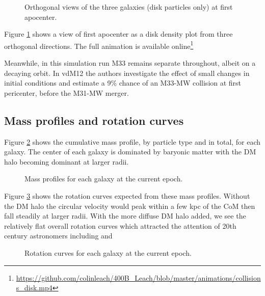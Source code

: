 \documentclass[twocolumn]{aastex63}
\newcommand{\todo}{\color{red}{TODO}\color{black}\hspace{2mm}}
\begin{document}
\begin{figure}[hbt!]
	\caption{Orthogonal views of the three galaxies (disk particles only) at first apocenter. \todo{improve this visually!}
		\label{fig:3view_first_apo}}
\end{figure}

Figure \ref{fig:3view_first_apo} shows a view of first apocenter as a disk density plot from three orthogonal directions. The full animation is available online\footnote{\url{https://github.com/colinleach/400B_Leach/blob/master/animations/collisions_disk.mp4}}


Meanwhile, in this simulation run M33 remains separate throughout, albeit on a decaying orbit. In vdM12 the authors investigate the effect of small changes in initial conditions and estimate a 9\% chance of an M33-MW collision at first pericenter, before the M31-MW merger.

\subsection{Mass profiles and rotation curves}

Figure \ref{fig:massprof0} shows the cumulative mass profile, by particle type and in total, for each galaxy. The center of each galaxy is dominated by baryonic matter with the DM halo becoming dominant at larger radii.
\begin{figure}[bht!]
	\caption{Mass profiles for each galaxy at the current epoch.
		\label{fig:massprof0}}
\end{figure}

Figure \ref{fig:rotcurve0} shows the rotation curves expected from these mass profiles. Without the DM halo the circular velocity would peak within a few kpc of the CoM then fall steadily at larger radii. With the more diffuse DM halo added, we see the relatively flat overall rotation curves which attracted the attention of 20th century astronomers including \citet{zwicky_rotverschiebung_1933} and \citet{rubin_rotation_1970}

\begin{figure}[!bht!]
	\caption{Rotation curves for each galaxy at the current epoch.
		\label{fig:rotcurve0}}
\end{figure}

\end{document}

